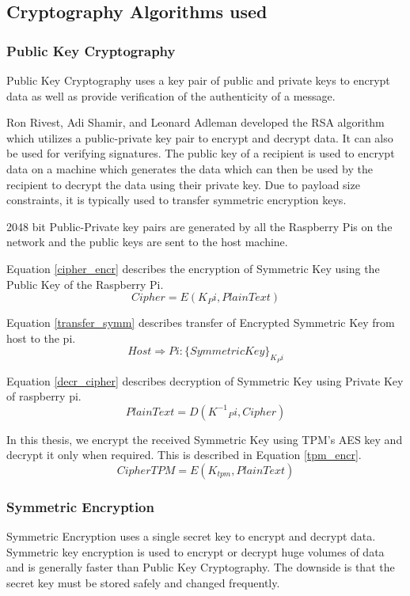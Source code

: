 \documentclass[11pt,openright]{report}
\begin{document}
\subsection{Cryptography Algorithms used}
\subsubsection{Public Key Cryptography}
Public Key Cryptography uses a key pair of public and private keys to encrypt data as well as provide verification of the authenticity of a message.

Ron Rivest, Adi Shamir, and Leonard Adleman developed the RSA algorithm which utilizes a public-private key pair to encrypt and decrypt data. It can also be used for verifying signatures. The public key of a recipient is used to encrypt data on a machine which generates the data which can then be used by the recipient to decrypt the data using their private key. Due to payload size constraints, it is typically used to transfer symmetric encryption keys.

2048 bit Public-Private key pairs are generated by all the Raspberry Pis on the network and the public keys are sent to the host machine.

Equation \ref{cipher_encr} describes the encryption of Symmetric Key using the Public Key of the Raspberry Pi.
\begin{equation} \label{cipher_encr}
    Cipher = E(K_Pi, PlainText)
\end{equation}

Equation \ref{transfer_symm} describes transfer of Encrypted Symmetric Key from host to the pi.
\begin{equation} \label{transfer_symm}
   Host \Rightarrow Pi : \{SymmetricKey\}_{K_Pi}
\end{equation}

Equation \ref{decr_cipher} describes decryption of Symmetric Key using Private Key of raspberry pi. 
\begin{equation}\label{decr_cipher}
    PlainText = D({K^{-1}}_Pi, Cipher)
\end{equation}

In this thesis, we encrypt the received Symmetric Key using TPM's AES key and decrypt it only when required. This is described in Equation \ref{tpm_encr}.
\begin{equation}\label{tpm_encr}
    CipherTPM = E(K_{tpm}, PlainText)
\end{equation}

\subsubsection{Symmetric Encryption}
Symmetric Encryption uses a single secret key to encrypt and decrypt data. Symmetric key encryption is used to encrypt or decrypt huge volumes of data and is generally faster than Public Key Cryptography. The downside is that the secret key must be stored safely and changed frequently.
\end{document}
